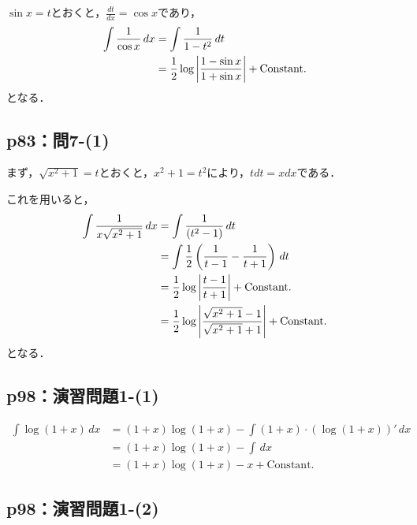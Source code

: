 \documentclass[uplatex,dvipdfmx,a4paper,10pt,fleqn]{jsarticle}
\newenvironment{tleftbar}{\begin{tbleftline}\setlength{\parindent}{1zw}}{\end{tbleftline}}
\begin{document}
\begin{tleftbar}
    $ \sin x = t$とおくと，$\frac{dt}{dx}= \cos x$であり，
    \begin{align*} 
        \int \frac{1}{\cos x}\, dx & = \int \frac{1}{1-t^2} \, dt \\
        & = \frac{1}{2} \log \abs{\frac{1-\sin x}{1+\sin x}} + \mathrm{Constant.}
    \end{align*}
    となる．
\end{tleftbar}


\subsection*{p83：問7-(1)}

\begin{tleftbar}
    まず，$ \sqrt{x^2+1}=t$とおくと，$x^2 + 1 = t^2$により，$ t dt = x dx $である．

    これを用いると，
    \begin{align*}
        \int \frac{1}{x\sqrt{x^2+1}} \, dx & = \int \frac{1}{(t^2-1)} \, dt \\
        & = \int  \frac{1}{2} \left (\frac{1}{t-1}-\frac{1}{t+1} \right ) \, dt \\
        & = \frac{1}{2} \log \abs{\frac{t-1}{t+1}} + \mathrm{Constant.} \\
        & = \frac{1}{2} \log \abs{\frac{\sqrt{x^2+1}-1}{\sqrt{x^2+1}+1}} +\mathrm{Constant.} 
    \end{align*}
    となる．
\end{tleftbar}


\subsection*{p98：演習問題1-(1)}

\begin{tleftbar}
    \begin{align*} 
        \int \log (1+x)\, dx & = (1+x) \log (1+x) - \int (1+x) \cdot (\log (1+x))' \, dx \\
        & = (1+x) \log (1+x) - \int \, dx \\
        & = (1+x) \log (1+x) - x +\mathrm{Constant.}
    \end{align*} 
\end{tleftbar}


\subsection*{p98：演習問題1-(2)}
\end{document}
